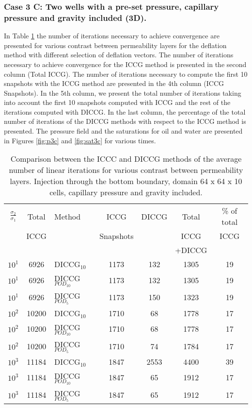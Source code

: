 \documentclass[12pt]{article}
\begin{document}
\subsubsection*{Case 3 C: Two wells with a pre-set pressure, capillary pressure and gravity included (3D).}
In Table \ref{table:liter3c} the number of iterations necessary to achieve convergence are presented for various contrast between permeability layers for the deflation method with different selection of deflation vectors. The number of iterations necessary to achieve convergence for the ICCG method is presented in the second column (Total ICCG). The number of iterations necessary to compute the first 10 snapshots with the ICCG method are presented in the 4th column (ICCG Snapshots). In the 5th column, we present the total number of iterations taking into account the first 10 snapshots computed with ICCG and the rest of the iterations computed with DICCG. In the last column, the percentage of the total number of iterations of the DICCG methods with respect to the ICCG method is presented.   
The pressure field and the saturations for oil and water are presented in Figures \ref{fig:p3c} and \ref{fig:sat3c} for various times.
\begin{table}[!h]\centering
\begin{minipage}{1\textwidth}
 \centering
\begin{tabular}{ ||c|c||l|c|c|c|c||} 
\hline
$\frac{\sigma_2}{\sigma_1}$&Total&Method  & ICCG&DICCG &Total&\% of total\\ 
                           & ICCG     &  & Snapshots& &ICCG& ICCG\\ 
                            &     &  & & &+DICCG& \\
\hline 
$10^{1}$ &6926& DICCG$_{10}$&1173&132&1305&19\\ 
\hline  
$10^{1}$ &6926& DICCG$_{POD_{10}}$&1173&132&1305&19 \\ 
\hline  
$10^{1}$ &6926& DICCG$_{POD_{5}}$&1173&150&1323&19 \\ 
\hline  
$10^{2}$ &10200& DICCG$_{10}$&1710&68&1778&17\\ 
\hline  
$10^{2}$ &10200& DICCG$_{POD_{10}}$&1710&68&1778&17 \\ 
\hline  
$10^{2}$ &10200& DICCG$_{POD_{5}}$&1710&74&1784&17 \\ 
\hline 
$10^{3}$ &11184& DICCG$_{10}$&1847&2553&4400&39\\ 
\hline  
$10^{3}$ &11184& DICCG$_{POD_{10}}$&1847&65&1912&17 \\ 
\hline  
$10^{3}$ &11184& DICCG$_{POD_{5}}$&1847&65&1912&17 \\ 
\hline 
\end{tabular} 
\caption{Comparison between the ICCC and DICCG methods of the average number of linear iterations for various contrast between permeability layers. Injection through the bottom boundary, domain 64 x 64 x 10 cells, capillary pressure and gravity included.}\label{table:liter3c} 
\end{minipage}  
\end{table}  
\end{document}
